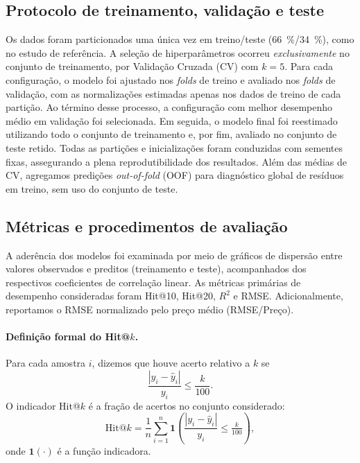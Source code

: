 \subsection{Protocolo de treinamento, validação e teste}
Os dados foram particionados uma única vez em treino/teste (\SI{66}{\percent}/\SI{34}{\percent}), como no estudo de referência. A seleção de hiperparâmetros ocorreu \emph{exclusivamente} no conjunto de treinamento, por Validação Cruzada (CV) com $k=5$. Para cada configuração, o modelo foi ajustado nos \textit{folds} de treino e avaliado nos \textit{folds} de validação, com as normalizações estimadas apenas nos dados de treino de cada partição. Ao término desse processo, a configuração com melhor desempenho médio em validação foi selecionada. Em seguida, o modelo final foi reestimado utilizando todo o conjunto de treinamento e, por fim, avaliado no conjunto de teste retido. Todas as partições e inicializações foram conduzidas com sementes fixas, assegurando a plena reprodutibilidade dos resultados. Além das médias de CV, agregamos predições \emph{out-of-fold} (OOF) para diagnóstico global de resíduos em treino, sem uso do conjunto de teste.

\subsection{Métricas e procedimentos de avaliação}
A aderência dos modelos foi examinada por meio de gráficos de dispersão entre valores observados e preditos (treinamento e teste), acompanhados dos respectivos coeficientes de correlação linear. 
As métricas primárias de desempenho consideradas foram Hit@10, Hit@20, $R^2$ e RMSE. Adicionalmente, reportamos o RMSE normalizado pelo preço médio (RMSE/Preço).

\paragraph{Definição formal do Hit@$k$.} 
Para cada amostra $i$, dizemos que houve acerto relativo a $k$ se
\begin{equation}
\frac{|y_i - \hat{y}_i|}{y_i} \le \frac{k}{100}.
\end{equation}
O indicador Hit@$k$ é a fração de acertos no conjunto considerado:
\begin{equation}
\text{Hit@}k = \frac{1}{n}\sum_{i=1}^{n} \mathbf{1}\!\left( \frac{|y_i - \hat{y}_i|}{y_i} \le \tfrac{k}{100} \right),
\end{equation}
onde $\mathbf{1}(\cdot)$ é a função indicadora.

